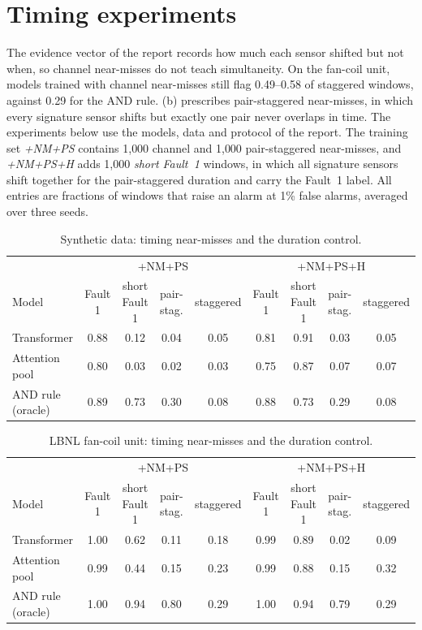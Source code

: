 \documentclass[11pt]{article}
\numberwithin{equation}{section}
\theoremstyle{plain}
\begin{document}
\section{Timing experiments}\label{sec:timing}

The evidence vector of the report records how much each sensor shifted but not when, so channel near-misses do not teach simultaneity. On the fan-coil unit, models trained with channel near-misses still flag 0.49--0.58 of staggered windows, against 0.29 for the AND rule. (b) prescribes pair-staggered near-misses, in which every signature sensor shifts but exactly one pair never overlaps in time. The experiments below use the models, data and protocol of the report. The training set \emph{+NM+PS} contains 1{,}000 channel and 1{,}000 pair-staggered near-misses, and \emph{+NM+PS+H} adds 1{,}000 \emph{short Fault~1} windows, in which all signature sensors shift together for the pair-staggered duration and carry the Fault~1 label. All entries are fractions of windows that raise an alarm at 1\% false alarms, averaged over three seeds.

\begin{table}[h]\centering\footnotesize\setlength{\tabcolsep}{2.6pt}
\renewcommand{\arraystretch}{1.15}
\caption{Synthetic data: timing near-misses and the duration control.}\label{tab:timing}
\begin{tabular}{@{}lcccc|cccc@{}}\toprule
 & \multicolumn{4}{c|}{+NM+PS} & \multicolumn{4}{c}{+NM+PS+H}\\
Model & Fault 1 & short Fault 1 & pair-stag. & staggered & Fault 1 & short Fault 1 & pair-stag. & staggered\\\midrule
Transformer & 0.88 & 0.12 & 0.04 & 0.05 & 0.81 & 0.91 & 0.03 & 0.05\\
Attention pool & 0.80 & 0.03 & 0.02 & 0.03 & 0.75 & 0.87 & 0.07 & 0.07\\
\midrule
AND rule (oracle) & 0.89 & 0.73 & 0.30 & 0.08 & 0.88 & 0.73 & 0.29 & 0.08\\
\bottomrule\end{tabular}\end{table}

\begin{table}[h]\centering\footnotesize\setlength{\tabcolsep}{2.6pt}
\renewcommand{\arraystretch}{1.15}
\caption{LBNL fan-coil unit: timing near-misses and the duration control.}\label{tab:fcu-timing}
\begin{tabular}{@{}lcccc|cccc@{}}\toprule
 & \multicolumn{4}{c|}{+NM+PS} & \multicolumn{4}{c}{+NM+PS+H}\\
Model & Fault 1 & short Fault 1 & pair-stag. & staggered & Fault 1 & short Fault 1 & pair-stag. & staggered\\\midrule
Transformer & 1.00 & 0.62 & 0.11 & 0.18 & 0.99 & 0.89 & 0.02 & 0.09\\
Attention pool & 0.99 & 0.44 & 0.15 & 0.23 & 0.99 & 0.88 & 0.15 & 0.32\\
\midrule
AND rule (oracle) & 1.00 & 0.94 & 0.80 & 0.29 & 1.00 & 0.94 & 0.79 & 0.29\\
\bottomrule\end{tabular}\end{table}
\end{document}
